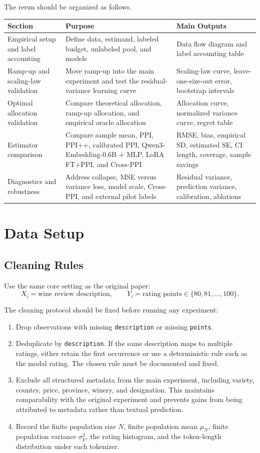 \documentclass[11pt]{article}
\begin{document}
The rerun should be organized as follows.

\begin{longtable}{p{}p{}p{}}
\toprule
Section & Purpose & Main Outputs \\
\midrule
Empirical setup and label accounting & Define data, estimand, labeled budget, unlabeled pool, and models & Data flow diagram and label accounting table \\
Ramp-up and scaling-law validation & Move ramp-up into the main experiment and test the residual-variance learning curve & Scaling-law curve, leave-one-size-out error, bootstrap intervals \\
Optimal allocation validation & Compare theoretical allocation, ramp-up allocation, and empirical oracle allocation & Allocation curve, normalized variance curve, regret table \\
Estimator comparison & Compare sample mean, PPI, PPI++, calibrated PPI, Qwen3-Embedding-0.6B + MLP, LoRA FT+PPI, and Cross-PPI & RMSE, bias, empirical SD, estimated SE, CI length, coverage, sample savings \\
Diagnostics and robustness & Address collapse, MSE versus variance loss, model scale, Cross-PPI, and external pilot labels & Residual variance, prediction variance, calibration, ablations \\
\bottomrule
\end{longtable}

\section{Data Setup}

\subsection{Cleaning Rules}

Use the same core setting as the original paper:
\[
X_i = \text{wine review description}, \qquad Y_i = \text{rating points} \in \{80,81,\ldots,100\}.
\]

The cleaning protocol should be fixed before running any experiment:

\begin{enumerate}
    \item Drop observations with missing \texttt{description} or missing \texttt{points}.
    \item Deduplicate by \texttt{description}. If the same description maps to multiple ratings, either retain the first occurrence or use a deterministic rule such as the modal rating. The chosen rule must be documented and fixed.
    \item Exclude all structured metadata from the main experiment, including variety, country, price, province, winery, and designation. This maintains comparability with the original experiment and prevents gains from being attributed to metadata rather than textual prediction.
    \item Record the finite population size $N$, finite population mean $\mu_N$, finite population variance $\sigma_Y^2$, the rating histogram, and the token-length distribution under each tokenizer.
\end{enumerate}
\end{document}
